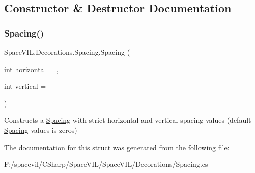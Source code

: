 \subsection{Constructor \& Destructor Documentation}
\mbox{\label{struct_space_v_i_l_1_1_decorations_1_1_spacing_aef752609b39f6b9c34545edff478fbb6}} 
\subsubsection{\texorpdfstring{Spacing()}{Spacing()}}
{\footnotesize\ttfamily Space\+V\+I\+L.\+Decorations.\+Spacing.\+Spacing (\begin{DoxyParamCaption}\item[{int}]{horizontal = {},  }\item[{int}]{vertical = {} }\end{DoxyParamCaption})}



Constructs a \mbox{\hyperlink{struct_space_v_i_l_1_1_decorations_1_1_spacing}{Spacing}} with strict horizontal and vertical spacing values (default \mbox{\hyperlink{struct_space_v_i_l_1_1_decorations_1_1_spacing}{Spacing}} values is zeros) 



The documentation for this struct was generated from the following file\+:\begin{DoxyCompactItemize}
\item 
F\+:/spacevil/\+C\+Sharp/\+Space\+V\+I\+L/\+Space\+V\+I\+L/\+Decorations/Spacing.\+cs\end{DoxyCompactItemize}
